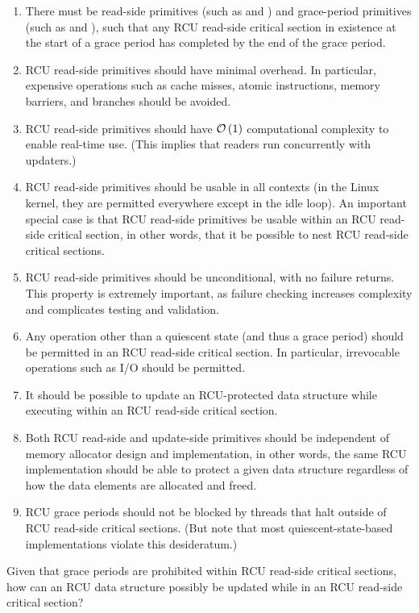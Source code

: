 \begin{enumerate}
\item	There must be read-side primitives (such as 
	and ) and grace-period primitives
	(such as  and ), such
	that any RCU read-side critical section in existence at the
	start of a grace period has completed by the end of the
	grace period.
\item	RCU read-side primitives should have minimal overhead.
	In particular, expensive operations such as cache misses,
	atomic instructions, memory barriers, and branches should
	be avoided.
\item	RCU read-side primitives should have $\mathcal{O}\left(1\right)$ computational
	complexity to enable real-time use.
	(This implies that readers run concurrently with updaters.)
\item	RCU read-side primitives should be usable in all contexts
	(in the Linux kernel, they are permitted everywhere except in
	the idle loop).
	An important special case is that RCU read-side primitives be
	usable within an RCU read-side critical section, in other words,
	that it be possible to nest RCU read-side critical sections.
\item	RCU read-side primitives should be unconditional, with no
	failure returns.
	This property is extremely important, as failure checking
	increases complexity and complicates testing and validation.
\item	Any operation other than a quiescent state (and thus a grace
	period) should be permitted in an RCU read-side critical section.
	In particular, irrevocable operations such as I/O should be
	permitted.
\item	It should be possible to update an RCU-protected data structure
	while executing within an RCU read-side critical section.
\item	Both RCU read-side and update-side primitives should be independent
	of memory allocator design and implementation, in other words,
	the same RCU implementation should be able to protect a given
	data structure regardless of how the data elements are allocated
	and freed.
\item	RCU grace periods should not be blocked by threads that
	halt outside of RCU read-side critical sections.
	(But note that most quiescent-state-based implementations
	violate this desideratum.)
\end{enumerate}

\QuickQuiz{}
	Given that grace periods are prohibited within RCU read-side
	critical sections, how can an RCU data structure possibly be
	updated while in an RCU read-side critical section?
 \QuickQuizEnd
